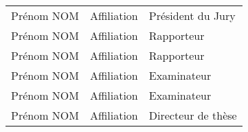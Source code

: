 \begin{tabular}{lll}
Prénom NOM & Affiliation & Président du Jury \\
    \vspace{0.08cm}
Prénom NOM & Affiliation & Rapporteur \\
    \vspace{0.08cm}
Prénom NOM & Affiliation & Rapporteur \\
    \vspace{0.08cm}
Prénom NOM & Affiliation & Examinateur \\
    \vspace{0.08cm}
Prénom NOM & Affiliation & Examinateur \\
    \vspace{0.08cm}
Prénom NOM & Affiliation & Directeur de thèse \\
\end{tabular}

\selectfont{} %